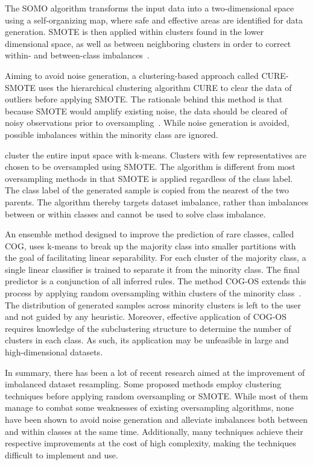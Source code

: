 \documentclass[sort&compress]{elsarticle}
\begin{document}
The \ac{SOMO} algorithm transforms the input data into a two-dimensional space using a self-organizing map, where safe and effective areas are identified for data generation. \ac{SMOTE} is then applied within clusters found in the lower dimensional space, as well as between neighboring clusters in order to correct within- and between-class imbalances~\citep{Douzas.2017}.

Aiming to avoid noise generation, a clustering-based approach called CURE-SMOTE uses the hierarchical clustering algorithm CURE to clear the data of outliers before applying \ac{SMOTE}. The rationale behind this method is that because \ac{SMOTE} would amplify existing noise, the data should be cleared of noisy observations prior to oversampling~\citep{Ma.2017}. While noise generation is avoided, possible imbalances within the minority class are ignored.

\citet{Santos.2015} cluster the entire input space with k-means. Clusters with few representatives are chosen to be oversampled using SMOTE. The algorithm is different from most oversampling methods in that \ac{SMOTE} is applied regardless of the class label. The class label of the generated sample is copied from the nearest of the two parents. The algorithm thereby targets dataset imbalance, rather than imbalances between or within classes and cannot be used to solve class imbalance.

An ensemble method designed to improve the prediction of rare classes, called COG, uses k-means to break up the majority class into smaller partitions with the goal of facilitating linear separability. For each cluster of the majority class, a single linear classifier is trained to separate it from the minority class. The final predictor is a conjunction of all inferred rules. The method COG-OS extends this process by applying random oversampling within clusters of the minority class~\citep{Wu.2010}. The distribution of generated samples across minority clusters is left to the user and not guided by any heuristic. Moreover, effective application of COG-OS requires knowledge of the subclustering structure to determine the number of clusters in each class. As such, its application may be unfeasible in large and high-dimensional datasets.

In summary, there has been a lot of recent research aimed at the improvement of imbalanced dataset resampling. Some proposed methods employ clustering techniques before applying random oversampling or \ac{SMOTE}. While most of them manage to combat some weaknesses of existing oversampling algorithms, none have been shown to avoid noise generation and alleviate imbalances both between and within classes at the same time. Additionally, many techniques achieve their respective improvements at the cost of high complexity, making the techniques difficult to implement and use.
\end{document}
